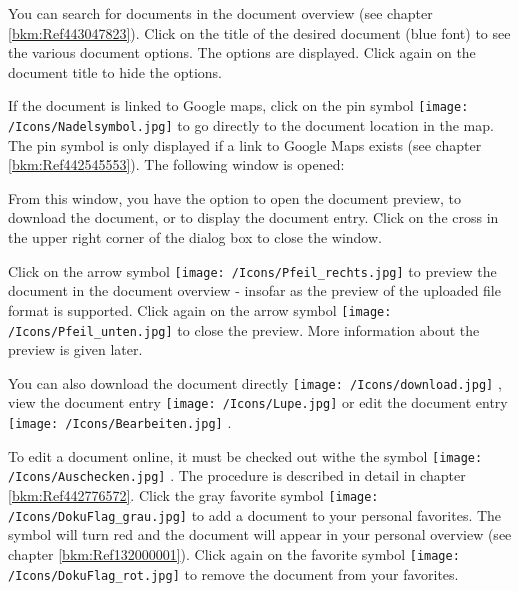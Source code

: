 You can search for documents in the document overview (see chapter \ref{bkm:Ref443047823}). Click on the title of the desired document (blue font)  to see the various document options. The options are displayed. Click again on the document title to hide the options. \newline

If the document is linked to Google maps, click on the pin symbol \texttt{[image: /Icons/Nadelsymbol.jpg]}  to go directly to the document location in the map. The pin symbol is only displayed if a link to Google Maps exists (see chapter \ref{bkm:Ref442545553}). The following window is opened:

\begin{figure}[H]
\end{figure}

From this window, you have the option to open the document preview, to download the document, or to display the document entry. Click on the cross in the upper right corner of the dialog box to close the window. \newline

Click on the arrow symbol \texttt{[image: /Icons/Pfeil\_rechts.jpg]}  to preview the document in the document overview - insofar as the preview of the uploaded file format is supported. Click again on the arrow symbol \texttt{[image: /Icons/Pfeil\_unten.jpg]} to close the preview. More information about the preview is given later. \newline

You can also download the document directly \texttt{[image: /Icons/download.jpg]} , view the document entry \texttt{[image: /Icons/Lupe.jpg]}  or edit the document entry \texttt{[image: /Icons/Bearbeiten.jpg]} . \newline

To edit a document online, it must be checked out withe the symbol \texttt{[image: /Icons/Auschecken.jpg]} . The procedure is described in detail in chapter \ref{bkm:Ref442776572}. Click the gray favorite symbol \texttt{[image: /Icons/DokuFlag\_grau.jpg]}  to add a document to your personal favorites. The symbol will turn red and the document will appear in your personal overview (see chapter \ref{bkm:Ref132000001}). Click again on the favorite symbol \texttt{[image: /Icons/DokuFlag\_rot.jpg]} to remove the document from your favorites. \newline

